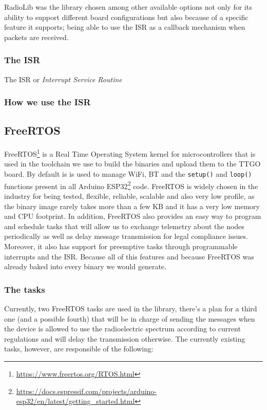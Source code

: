 RadioLib was the library chosen among other available options not only for its ability to support different board configurations but also because of a specific feature it supports; being able to use the ISR as a callback mechanism when packets are received.
\subsubsection{The ISR}
The ISR or \textit{Interrupt Service Routine}
\subsubsection{How we use the ISR}
\subsection{FreeRTOS}
FreeRTOS\footnote{\url{https://www.freertos.org/RTOS.html}} is a Real Time Operating System kernel for microcontrollers that is used in the toolchain we use to build the binaries and upload them to the TTGO board. By default is is used to manage WiFi, BT and the \texttt{setup()} and \texttt{loop()} functions present in all Arduino ESP32\footnote{\url{https://docs.espressif.com/projects/arduino-esp32/en/latest/getting_started.html}} code. FreeRTOS is widely chosen in the industry for being tested, flexible, reliable, scalable and also very low profile, as the binary image rarely takes more than a few KB and it has a very low memory and CPU footprint\cite{FreeRTOSCharacteristics}. In addition, FreeRTOS also provides an easy way to program and schedule tasks that will allow us to exchange telemetry about the nodes periodically as well as delay message transmission for legal compliance issues. Moreover, it also has support for preemptive tasks through programmable interrupts and the ISR.
Because all of this features and because FreeRTOS was already baked into every binary we would generate.
\subsubsection{The tasks}
Currently, two FreeRTOS tasks are used in the library, there's a plan for a third one (and a possible fourth) that will be in charge of sending the messages when the device is allowed to use the radioelectric spectrum according to current regulations and will delay the transmission otherwise. The currently existing tasks, however, are responsible of the following:
